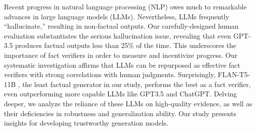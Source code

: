 Recent progress in natural language processing (NLP) owes much to remarkable advances in large language models (LLMs). Nevertheless, LLMs frequently “hallucinate,” resulting in non-factual outputs. Our carefully-designed human evaluation substantiates the serious hallucination issue, revealing that even GPT-3.5 produces factual outputs less than 25\% of the time. This underscores the importance of fact verifiers in order to measure and incentivize progress. Our systematic investigation affirms that LLMs can be repurposed as effective fact verifiers with strong correlations with human judgments. Surprisingly, FLAN-T5-11B , the least factual generator in our study, performs the best as a fact verifier, even outperforming more capable LLMs like GPT3.5 and ChatGPT. Delving deeper, we analyze the reliance of these LLMs on high-quality evidence, as well as their deficiencies in robustness and generalization ability. Our study presents insights for developing trustworthy generation models.